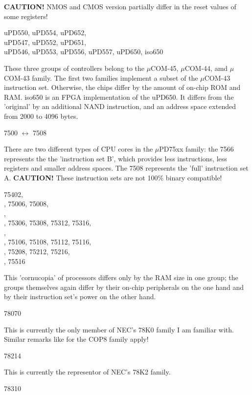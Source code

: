 \documentclass[12pt,twoside]{report}
\newcommand{\bb}[1]{{\bf #1}}
\begin{document}
\bb{CAUTION!} NMOS and CMOS version partially differ in the reset
values of some registers!
\begin{cpulist}
   uPD550, uPD554, uPD652, \\
\> uPD547, uPD552, uPD651, \\
\> uPD546, uPD553, uPD556, uPD557, uPD650, iso650
\end{cpulist}
These three groups of controllers belong to the $\mu$COM-45,
$\mu$COM-44, amd $\mu$COM-43 family.  The first two families
implement a subset of the $\mu$COM-43 instruction set.  Otherwise,
the chips differ by the amount of on-chip ROM and RAM.
iso650 is an FPGA implementation of the uPD650.  It differs from
the 'original' by an additional NAND instruction, and an address
space extended from 2000 to 4096 bytes.
\begin{cpulist}
   7500 $\leftrightarrow$ 7508
\end{cpulist}
There are two different types of CPU cores in the $\mu$PD75xx
family: the 7566 represents the the 'instruction set B', which
provides less instructions, less registers and smaller address
spaces.  The 7508 represents the 'full' instruction set A.  {\bf
CAUTION!} These instruction sets are not 100\% binary compatible!
\begin{cpulist}
   75402,\\
, 75006, 75008,\\
,\\
, 75306, 75308, 75312, 75316,\\
,\\
, 75106, 75108, 75112, 75116,\\
, 75208, 75212, 75216,\\
, 75516
\end{cpulist}
This 'cornucopia' of processors differs only by the RAM size in one
group; the groups themselves again differ by their on-chip
peripherals on the one hand and by their instruction set's power on
the other hand.
\begin{cpulist}
   78070
\end{cpulist}
This is currently the only member of NEC's 78K0 family I am familiar
with.  Similar remarks like for the COP8 family apply!
\begin{cpulist}
   78214
\end{cpulist}
This is currently the representor of NEC's 78K2 family.
\begin{cpulist}
   78310
\end{cpulist}
\end{document}
